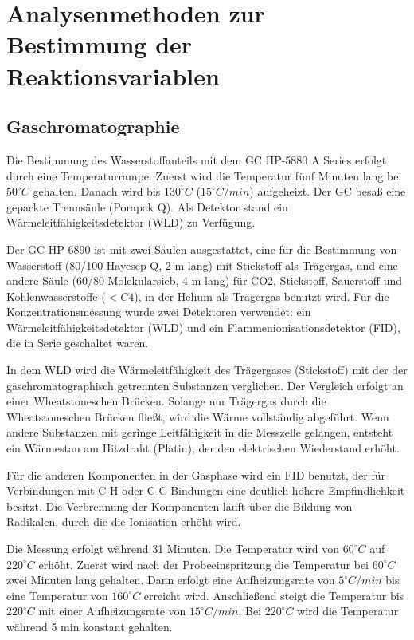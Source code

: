 \chapter{Analysenmethoden zur Bestimmung der Reaktionsvariablen }

\section{Gaschromatographie}

Die Bestimmung des Wasserstoffanteils mit dem GC HP-5880 A Series erfolgt durch eine Temperaturrampe. Zuerst wird die Temperatur fünf Minuten lang bei $50 ^{\circ}C$ gehalten. Danach wird bis $130 ^{\circ}C$ ($15 ^{\circ}C/min$) aufgeheizt. Der GC besaß eine gepackte Trennsäule (Porapak Q). Als Detektor stand ein Wärmeleitfähigkeitsdetektor (WLD) zu Verfügung. 

Der GC HP 6890 ist mit zwei Säulen ausgestattet, eine für die Bestimmung von Wasserstoff (80/100 Hayesep Q, 2 m lang)  mit Stickstoff als Trägergas, und eine andere Säule (60/80 Molekularsieb, 4 m lang) für CO2, Stickstoff, Sauerstoff und Kohlenwasserstoffe ($< C4$), in der Helium als Trägergas benutzt wird. Für die Konzentrationsmessung wurde zwei Detektoren verwendet: ein Wärmeleitfähigkeitsdetektor (WLD) und ein Flammenionisationsdetektor (FID), die in Serie geschaltet waren. 

In dem WLD wird die Wärmeleitfähigkeit des Trägergases (Stickstoff) mit der der gaschromatographisch getrennten Substanzen verglichen. Der Vergleich erfolgt an einer Wheatstoneschen Brücken. Solange nur Trägergas durch die Wheatstoneschen Brücken fließt, wird die Wärme vollständig abgeführt. Wenn andere Substanzen mit geringe Leitfähigkeit in die Messzelle gelangen, entsteht ein Wärmestau am Hitzdraht (Platin), der den elektrischen Wiederstand erhöht. 

Für die anderen Komponenten in der Gasphase wird ein FID benutzt, der für Verbindungen mit C-H oder C-C Bindungen eine deutlich höhere Empfindlichkeit besitzt. Die Verbrennung der Komponenten läuft über die Bildung von Radikalen, durch die die Ionisation erhöht wird. 

Die Messung erfolgt während 31 Minuten. Die Temperatur wird von $60 ^{\circ}C$ auf $220 ^{\circ}C$ erhöht. Zuerst wird nach der Probeeinspritzung die Temperatur bei $60 ^{\circ}C$ zwei Minuten lang gehalten. Dann erfolgt eine Aufheizungsrate von $5 ^{\circ}C/min$  bis eine Temperatur von $160 ^{\circ}C$ erreicht wird. Anschließend steigt die Temperatur bis $220 ^{\circ}C$ mit einer Aufheizungsrate von $15 ^{\circ}C/min$. Bei $220 ^{\circ}C$ wird die Temperatur während  5 min konstant gehalten. 


